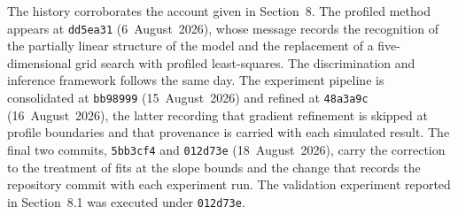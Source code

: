 \documentclass[11pt,a4paper]{article}
\begin{document}
The history corroborates the account given in Section~8. The profiled
method appears at \texttt{dd5ea31} (6~August~2026), whose message records
the recognition of the partially linear structure of the model and the
replacement of a five-dimensional grid search with profiled
least-squares. The discrimination and inference framework follows the
same day. The experiment pipeline is consolidated at \texttt{bb98999}
(15~August~2026) and refined at \texttt{48a3a9c} (16~August~2026), the
latter recording that gradient refinement is skipped at profile
boundaries and that provenance is carried with each simulated result.
The final two commits, \texttt{5bb3cf4} and \texttt{012d73e}
(18~August~2026), carry the correction to the treatment of fits at the
slope bounds and the change that records the repository commit with each
experiment run. The validation experiment reported in Section~8.1 was
executed under \texttt{012d73e}.
\end{document}
